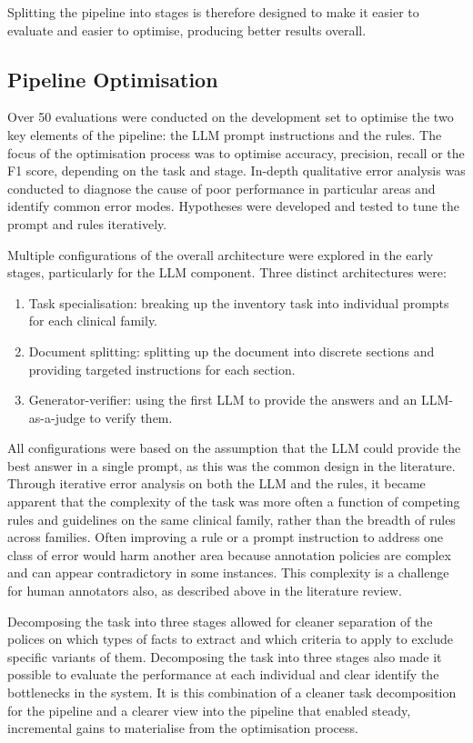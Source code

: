 \documentclass[conference]{IEEEtran}
\begin{document}
Splitting the pipeline into stages is therefore designed to 
make it easier to evaluate and easier to optimise, producing 
better results overall.

\subsection{Pipeline Optimisation}

Over 50 evaluations were conducted on the development set 
to optimise the two key elements of the pipeline: the LLM
prompt instructions and the rules. The focus of the optimisation 
process was to optimise accuracy, precision, recall or the F1 
score, depending on the task and stage. In-depth qualitative 
error analysis was conducted to diagnose the cause of poor
performance in particular areas and identify common error 
modes. Hypotheses were developed and tested to tune the 
prompt and rules iteratively. 

Multiple configurations of the overall architecture 
were explored in the early stages, particularly for the 
LLM component. Three distinct architectures were: 

\begin{enumerate}
\item Task specialisation: breaking up the inventory task into 
individual prompts for each clinical family.
\item Document splitting: splitting up the document into discrete
sections and providing targeted instructions for each section.
\item Generator-verifier: using the first LLM to provide the answers 
and an LLM-as-a-judge to verify them.
\end{enumerate}

All configurations were based on the assumption that 
the LLM could provide the best answer in a single prompt,
as this was the common design in the literature. Through
iterative error analysis on both the LLM and the rules,
it became apparent that the complexity of the task was 
more often a function of competing rules and guidelines
on the same clinical family, rather than the breadth of rules
across families. Often improving a rule or a prompt 
instruction to address one class of error would harm 
another area because annotation policies are complex 
and can appear contradictory in some instances. This 
complexity is a challenge for human annotators also, 
as described above in the literature review.

Decomposing the task into three stages allowed for 
cleaner separation of the polices on which types of 
facts to extract and which criteria to apply to exclude
specific variants of them. Decomposing the task into
three stages also made it possible to evaluate the 
performance at each individual and clear identify the 
bottlenecks in the system. It is this combination of 
a cleaner task decomposition for the pipeline and a
clearer view into the pipeline that enabled steady,
incremental gains to materialise from the optimisation
process.
\end{document}
